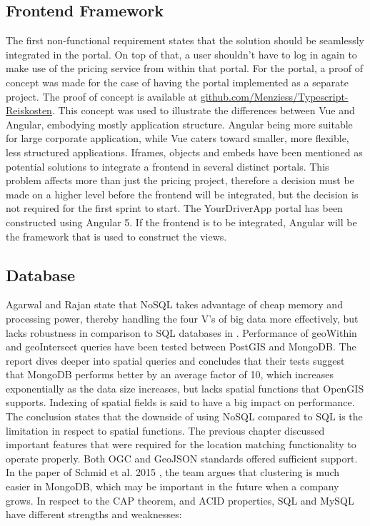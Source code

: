 \subsection{Frontend Framework}
The first non-functional requirement states that the solution should be seamlessly integrated in the portal. On top of that, a user shouldn’t have to log in again to make use of the pricing service from within that portal. For the portal, a proof of concept was made for the case of having the portal implemented as a separate project. The proof of concept is available at \url{github.com/Menziess/Typescript-Reiskosten}. This concept was used to illustrate the differences between Vue and Angular, embodying mostly application structure. Angular being more suitable for large corporate application, while Vue caters toward smaller, more flexible, less structured applications. Iframes, objects and embeds have been mentioned as potential solutions to integrate a frontend in several distinct portals. This problem affects more than just the pricing project, therefore a decision must be made on a higher level before the frontend will be integrated, but the decision is not required for the first sprint to start. The YourDriverApp portal has been constructed using Angular 5. If the frontend is to be integrated, Angular will be the framework that is used to construct the views.

\subsection{Database}
Agarwal and Rajan state that NoSQL takes advantage of cheap memory and processing power, thereby handling the four V’s of big data more effectively, but lacks robustness in comparison to SQL databases in \cite{AGS}. Performance of geoWithin and geoIntersect queries have been tested between PostGIS and MongoDB. The report dives deeper into spatial queries and concludes that their tests suggest that MongoDB performs better by an average factor of 10, which increases exponentially as the data size increases, but lacks spatial functions that OpenGIS supports. Indexing of spatial fields is said to have a big impact on performance. The conclusion states that the downside of using NoSQL compared to SQL is the limitation in respect to spatial functions. The previous chapter discussed important features that were required for the location matching functionality to operate properly. Both OGC and GeoJSON standards offered sufficient support. In the paper of Schmid et al. 2015 \cite{SCS}, the team argues that clustering is much easier in MongoDB, which may be important in the future when a company grows. In respect to the CAP theorem, and ACID properties, SQL and MySQL have different strengths and weaknesses:

